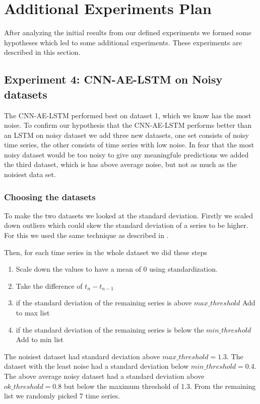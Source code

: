 \section{Additional Experiments Plan}
After analyzing the initial results from our defined experiments
we formed some hypotheses which led to some additional experiments.
These experiments are described in this section.

\subsection{Experiment 4: CNN-AE-LSTM on Noisy datasets}
The CNN-AE-LSTM performed best on dataset 1, which we know
has the most noise. To confirm our hypothesis
that the CNN-AE-LSTM performs better than an LSTM
on noisy dataset we add three new datasets,
one set consists of noisy time series,
the other consists of time series with low noise.
In fear that the most noisy dataset would be too noisy to give any meaningfule
predictions we added the third dataset, which is has above average noise, but not
as much as the noisiest data set.


\subsubsection{Choosing the datasets}
To make the two datasets we looked at the standard deviation.
Firstly we scaled down outliers which could skew the standard deviation of
a series to be higher. For this we used the same technique
as described in .

Then, for each time series in the whole dataset we did these steps
\begin{enumerate}
  \item Scale down the values to have a mean of 0 using standardization.
  \item Take the difference of $t_n - t_{n-1}$
  \item if the standard deviation of the remaining series is above $max\_threshold$ \-\> Add to max list
  \item if the standard deviation of the remaining series is below the $min\_threshold$ \-\> Add to min list
\end{enumerate}

The noisiest dataset had standard deviation above $max\_threshold = 1.3$.
The dataset with the least noise had a standard deviation below $min\_threshold = 0.4$.
The above average noisy dataset had a standard deviation above $ok\_threshold = 0.8$
but below the maximum threshold of 1.3.
From the remaining list we randomly picked 7 time series.

